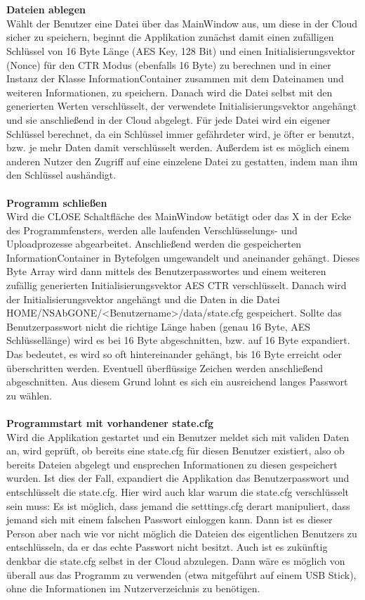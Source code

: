 \documentclass[12pt,a4paper,bibliography=totocnumbered,listof=totocnumbered]{scrartcl}
\begin{document}
\\\\\textbf{Dateien ablegen}\\
Wählt der Benutzer eine Datei über das MainWindow aus, um diese in der Cloud sicher zu speichern, beginnt die Applikation zunächst damit einen zufälligen Schlüssel von 16 Byte Länge (AES Key, 128 Bit) und einen Initialisierungsvektor (Nonce) für den CTR Modus (ebenfalls 16 Byte) zu berechnen und in einer Instanz der Klasse InformationContainer zusammen mit dem Dateinamen und weiteren Informationen, zu speichern. Danach wird die Datei selbst mit den generierten Werten verschlüsselt, der verwendete Initialisierungsvektor angehängt und sie anschließend in der Cloud abgelegt. Für jede Datei wird ein eigener Schlüssel berechnet, da ein Schlüssel immer gefährdeter wird, je öfter er benutzt, bzw. je mehr Daten damit verschlüsselt werden. Außerdem ist es möglich einem anderen Nutzer den Zugriff auf eine einzelene Datei zu gestatten, indem man ihm den Schlüssel aushändigt. 
\\\\\textbf{Programm schließen}\\
Wird die CLOSE Schaltfläche des MainWindow betätigt oder das X in der Ecke des Programmfensters, werden alle laufenden Verschlüsselungs- und Uploadprozesse abgearbeitet. Anschließend werden die gespeicherten InformationContainer in Bytefolgen umgewandelt und aneinander gehängt. Dieses Byte Array wird dann mittels des Benutzerpasswortes und einem weiteren zufällig generierten Initialisierungsvektor AES CTR verschlüsselt. Danach wird der Initialisierungsvektor angehängt und die Daten in die Datei HOME/NSAbGONE/\textless Benutzername\textgreater/data/state.cfg gespeichert. Sollte das Benutzerpasswort nicht die richtige Länge haben (genau 16 Byte, AES Schlüssellänge) wird es bei 16 Byte abgeschnitten, bzw. auf 16 Byte expandiert. Das bedeutet, es wird so oft hintereinander gehängt, bis 16 Byte erreicht oder überschritten werden. Eventuell überflüssige Zeichen werden anschließend abgeschnitten. Aus diesem Grund lohnt es sich ein ausreichend langes Passwort zu wählen.
\\\\\textbf{Programmstart mit vorhandener state.cfg}\\
Wird die Applikation gestartet und ein Benutzer meldet sich mit validen Daten an, wird geprüft, ob bereits eine state.cfg für diesen Benutzer existiert, also ob bereits Dateien abgelegt und ensprechen Informationen zu diesen gespeichert wurden. Ist dies der Fall, expandiert die Applikation das Benutzerpasswort und entschlüsselt die state.cfg. Hier wird auch klar warum die state.cfg verschlüsselt sein muss: Es ist möglich, dass jemand die setttings.cfg derart manipuliert, dass jemand sich mit einem falschen Passwort einloggen kann. Dann ist es dieser Person aber nach wie vor nicht möglich die Dateien des eigentlichen Benutzers zu entschlüsseln, da er das echte Passwort nicht besitzt. Auch ist es zukünftig denkbar die state.cfg selbst in der Cloud abzulegen. Dann wäre es möglich von überall aus das Programm zu verwenden (etwa mitgeführt auf einem USB Stick), ohne die Informationen im Nutzerverzeichnis zu benötigen.
\end{document}
